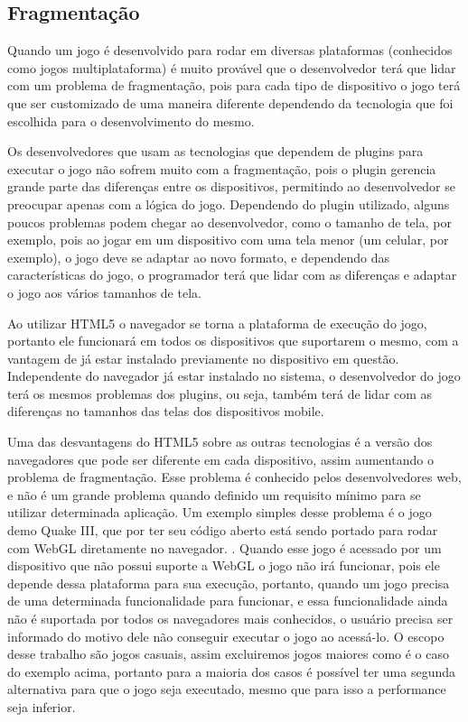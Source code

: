 \subsection{Fragmentação}

Quando um jogo é desenvolvido para rodar em diversas plataformas
(conhecidos como jogos multiplataforma) é muito provável que o
desenvolvedor terá que lidar com um problema de fragmentação, pois
para cada tipo de dispositivo o jogo terá que ser customizado de uma
maneira diferente dependendo da tecnologia que foi escolhida para o
desenvolvimento do mesmo.

Os desenvolvedores que usam as tecnologias que dependem de plugins para executar o
jogo não sofrem muito com a fragmentação, pois o plugin gerencia
grande parte das diferenças entre os dispositivos, permitindo ao
desenvolvedor se preocupar apenas com a lógica do jogo. Dependendo do
plugin utilizado, alguns poucos problemas podem chegar ao
desenvolvedor, como o tamanho de tela, por exemplo, pois ao jogar em
um dispositivo com uma tela menor (um celular, por exemplo), o jogo
deve se adaptar ao novo formato, e dependendo das características do jogo, o
programador terá que lidar com as diferenças e adaptar o jogo aos
vários tamanhos de tela.

Ao utilizar HTML5 o navegador se torna a plataforma de execução do
jogo, portanto ele funcionará em todos os dispositivos que
suportarem o mesmo, com a vantagem de já estar instalado previamente
no dispositivo em questão.
Independente do navegador já estar instalado no sistema, o
desenvolvedor do jogo terá os mesmos problemas dos plugins, ou seja,
também terá de lidar com as diferenças no tamanhos das telas dos
dispositivos mobile.

Uma das desvantagens do HTML5 sobre as outras tecnologias é a versão
dos navegadores que pode ser diferente em cada dispositivo, assim
aumentando o problema de fragmentação. Esse problema é conhecido pelos
desenvolvedores web, e não é um grande problema quando definido um
requisito mínimo para se utilizar determinada aplicação. Um exemplo
simples desse problema é o jogo demo Quake III, que por ter seu código
aberto está sendo portado para rodar com WebGL diretamente no navegador.
\cite{website:webglquake3}. Quando esse jogo é acessado por um
dispositivo que não possui suporte a WebGL o jogo não irá funcionar,
pois ele depende dessa plataforma para sua execução, portanto, quando
um jogo precisa de uma determinada funcionalidade para funcionar, e
essa funcionalidade ainda não é suportada por todos os navegadores
mais conhecidos, o usuário precisa ser informado do motivo dele não
conseguir executar o jogo ao acessá-lo.
O escopo desse trabalho são jogos casuais, assim excluiremos jogos
maiores como é o caso do exemplo acima, portanto para a maioria dos
casos é possível ter uma segunda alternativa para que o jogo seja
executado, mesmo que para isso a performance seja inferior.

